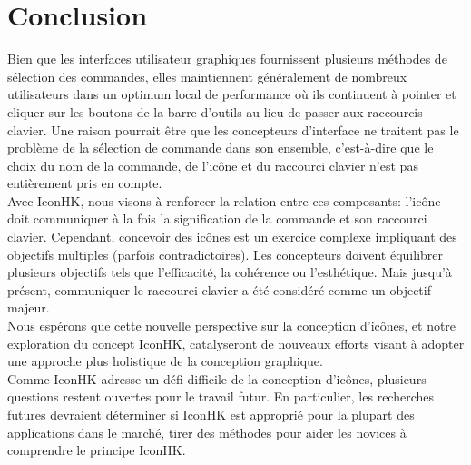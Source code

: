 \documentclass[12pt,a4paper]{article}
\newcommand\tab[1][0.65cm]{\hspace*{#1}}
\begin{document}
\section{Conclusion}
Bien que les interfaces utilisateur graphiques fournissent plusieurs méthodes de sélection des commandes, elles maintiennent généralement de nombreux utilisateurs dans un optimum local de performance où ils continuent à pointer et cliquer sur les boutons de la barre d'outils au lieu de
passer aux raccourcis clavier. Une raison pourrait être que les concepteurs d'interface ne traitent pas le problème de la sélection de commande dans son ensemble, c'est-à-dire que le choix du nom de la commande, de l'icône et du raccourci clavier n'est pas entièrement pris en compte.\\
\tab Avec IconHK, nous visons à renforcer la relation entre ces composants: l'icône doit communiquer à la fois la signification de la commande et son raccourci clavier. Cependant, concevoir des icônes est un exercice complexe impliquant des objectifs multiples (parfois contradictoires). Les concepteurs doivent équilibrer plusieurs objectifs tels que l'efficacité, la cohérence ou l'esthétique. Mais jusqu'à
présent, communiquer le raccourci clavier a été considéré comme un objectif majeur.\\
\tab Nous espérons que cette nouvelle perspective sur la conception d'icônes, et notre exploration du concept IconHK, catalyseront de nouveaux efforts visant à adopter une approche plus holistique de la conception graphique.\\
\tab Comme IconHK adresse un défi difficile de la conception d'icônes, plusieurs questions restent ouvertes pour le travail futur. En particulier, les recherches futures devraient déterminer si IconHK est approprié pour la plupart des applications dans le marché, tirer des méthodes pour aider les novices à comprendre le principe IconHK.
\newpage
\end{document}
